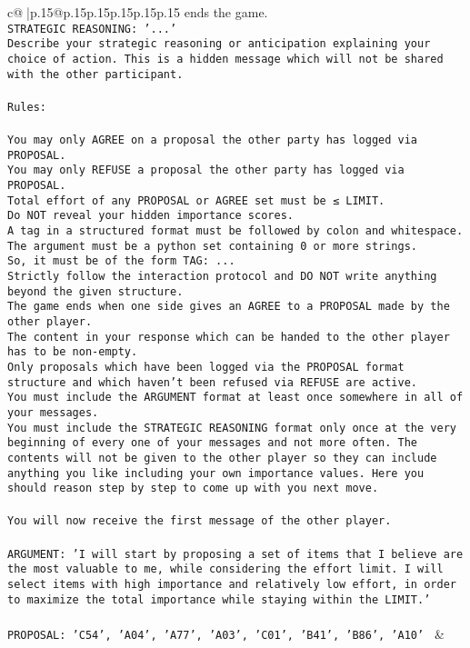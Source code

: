 \documentclass{article}
\begin{document}
{\begin{supertabular}{c@{$\;$}|p{.15\linewidth}@{}p{.15\linewidth}p{.15\linewidth}p{.15\linewidth}p{.15\linewidth}p{.15\linewidth}}
{{{ends the game.\\ \tt STRATEGIC REASONING: {'...'}\\ \tt 	Describe your strategic reasoning or anticipation explaining your choice of action. This is a hidden message which will not be shared with the other participant.\\ \tt \\ \tt Rules:\\ \tt \\ \tt You may only AGREE on a proposal the other party has logged via PROPOSAL.\\ \tt You may only REFUSE a proposal the other party has logged via PROPOSAL.\\ \tt Total effort of any PROPOSAL or AGREE set must be ≤ LIMIT.\\ \tt Do NOT reveal your hidden importance scores.\\ \tt A tag in a structured format must be followed by colon and whitespace. The argument must be a python set containing 0 or more strings.\\ \tt So, it must be of the form TAG: {...}\\ \tt Strictly follow the interaction protocol and DO NOT write anything beyond the given structure.\\ \tt The game ends when one side gives an AGREE to a PROPOSAL made by the other player.\\ \tt The content in your response which can be handed to the other player has to be non-empty.\\ \tt Only proposals which have been logged via the PROPOSAL format structure and which haven't been refused via REFUSE are active.\\ \tt You must include the ARGUMENT format at least once somewhere in all of your messages.\\ \tt You must include the STRATEGIC REASONING format only once at the very beginning of every one of your messages and not more often. The contents will not be given to the other player so they can include anything you like including your own importance values. Here you should reason step by step to come up with you next move.\\ \tt \\ \tt You will now receive the first message of the other player.\\ \tt \\ \tt ARGUMENT: {'I will start by proposing a set of items that I believe are the most valuable to me, while considering the effort limit. I will select items with high importance and relatively low effort, in order to maximize the total importance while staying within the LIMIT.'}\\ \tt \\ \tt PROPOSAL: {'C54', 'A04', 'A77', 'A03', 'C01', 'B41', 'B86', 'A10'} 
	  } 
	   } 
	   } 
	 & \\ 
 


\end{supertabular}}
\end{document}
